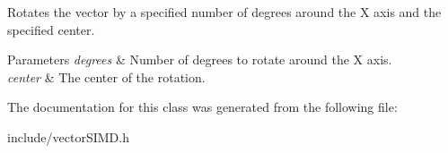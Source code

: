 Rotates the vector by a specified number of degrees around the X axis and the specified center. 


\begin{DoxyParams}{Parameters}
{\em degrees} & Number of degrees to rotate around the X axis. \\
\hline
{\em center} & The center of the rotation. \\
\hline
\end{DoxyParams}


The documentation for this class was generated from the following file\+:\begin{DoxyCompactItemize}
\item 
include/vector\+S\+I\+M\+D.\+h\end{DoxyCompactItemize}
